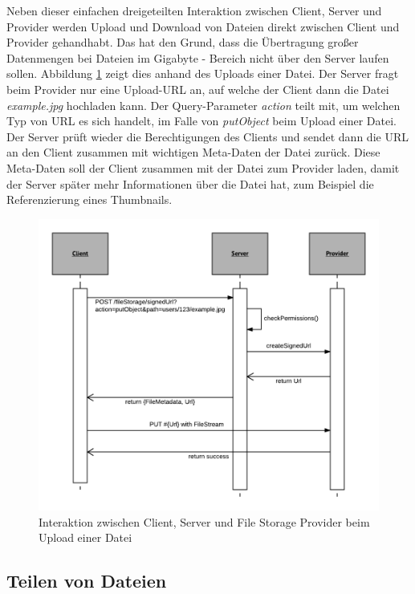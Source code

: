 Neben dieser einfachen dreigeteilten Interaktion zwischen Client, Server und Provider werden Upload und Download von Dateien direkt zwischen Client und Provider gehandhabt. Das hat den Grund, dass die Übertragung großer Datenmengen bei Dateien im Gigabyte - Bereich nicht über den Server laufen sollen. Abbildung \ref{fig:interaction_upload} zeigt dies anhand des Uploads einer Datei. Der Server fragt beim Provider nur eine Upload-URL an, auf welche der Client dann die Datei \textit{example.jpg} hochladen kann. Der Query-Parameter \textit{action} teilt mit, um welchen Typ von URL es sich handelt, im Falle von \textit{putObject} beim Upload einer Datei. Der Server prüft wieder die Berechtigungen des Clients und sendet dann die URL an den Client zusammen mit wichtigen Meta-Daten der Datei zurück. Diese Meta-Daten soll der Client zusammen mit der Datei zum Provider laden, damit der Server später mehr Informationen über die Datei hat, zum Beispiel die Referenzierung eines Thumbnails.

\begin{figure}[H]
	\centering
	\includegraphics[width=1\linewidth]{images/fileuploadumlsequence}
	\caption[Caption for concept]{Interaktion zwischen Client, Server und File Storage Provider beim Upload einer Datei}
	\label{fig:interaction_upload}
\end{figure}


\subsection{Teilen von Dateien}

